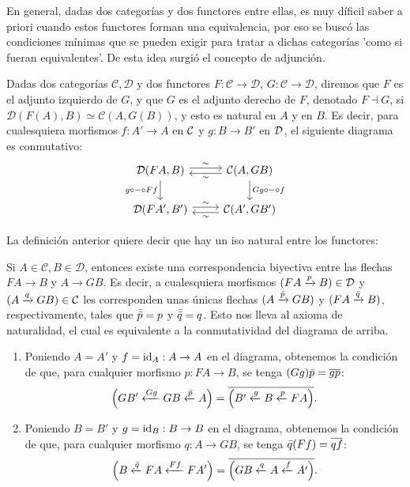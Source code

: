 En general, dadas dos categorías y dos functores entre ellas, es muy díficil saber a priori cuando estos functores forman una equivalencia, por eso se buscó las condiciones mínimas que se pueden exigir para tratar a dichas categorías 'como si fueran equivalentes'. De esta idea surgió el concepto de adjunción.
\begin{defn}
    Dadas dos categorías $\mathcal{C,D}$ y dos functores $F:\mathcal{C\to D}$, $G:\mathcal{C\to D}$, diremos que $F$ es el adjunto izquierdo de $G$, y que $G$ es el adjunto derecho de $F$, denotado $F\dashv G$, si $\mathcal{D}(F(A),B)\simeq \mathcal{C}(A,G(B))$, y esto es natural en $A$ y en $B$.
    Es decir, para cualesquiera morfismos $f:A'\to A$
    en $\cal C$ y $g:B\to B'$ en $\cal D$,
    el siguiente diagrama es conmutativo:
    \[
        \begin{tikzcd}
            \cal D(FA,B)
                \ar[d,"g\circ-\circ Ff"']
                \ar[r,"\sim",shift left]
            & \cal C(A,GB) 
                \ar[d,"Gg\circ-\circ f"]
                \ar[l,"\sim",shift left] \\
            \cal D(FA',B')
                \ar[r,"\sim",shift left]
            & \cal C(A',GB')
                \ar[l,"\sim",shift left]
        \end{tikzcd}
    \]
\end{defn}
La definición anterior quiere decir que hay un iso natural entre los functores:

Si $A\in\mathcal{C}, B\in\mathcal{D}$,
entonces existe una correspondencia biyectiva entre las flechas
$FA\to B$ y $A\to GB$.
Es decir, a cualesquiera morfismos
$(FA\xto p B)\in\cal{D}$
y $(A\xto q GB)\in\mathcal{C}$
les corresponden unas únicas flechas
$(A\xto{\Bar{p}}GB)$
y $(FA\xto{\Bar{q}}B)$,
respectivamente,
tales que $\Bar{\Bar{p}}=p$ y $\Bar{\Bar{q}}=q$.
Esto nos lleva al axioma de naturalidad,
el cual es equivalente a la conmutatividad
del diagrama de arriba.

\begin{axiom}[De naturalidad]
    \leavevmode
    \begin{enumerate}
        \item
        Poniendo $A=A'$ y $f=\id_A:A\to A$ en el diagrama,
        obtenemos la condición de que,
        para cualquier morfismo $p:FA\to B$,
        se tenga $(Gg)\bar p=\ol{gp}$:
        \[
            \Big(GB' \lar{Gg} GB \lar{\bar p} A\Big)
            =
            \ol{\Big(B' \lar g B \lar p FA \Big)}
        .\]
        \item
        Poniendo $B=B'$ y $g=\id_B:B\to B$ en el diagrama,
        obtenemos la condición de que,
        para cualquier morfismo $q:A\to GB$,
        se tenga $\bar q(Ff)=\ol{qf}$:
        \[
            \Big(B\lar{\bar q} FA\lar{Ff}FA'\Big)
            =
            \ol{\Big(GB\lar q A\lar f A'\Big)}
        .\]
    \end{enumerate}
\end{axiom}

